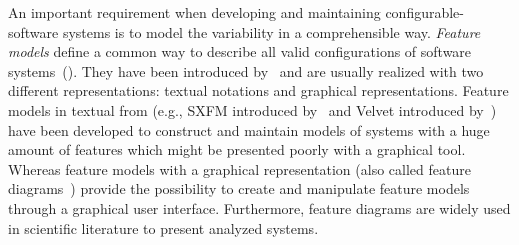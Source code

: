 An important requirement when developing and maintaining configurable-software systems is to model the variability in a comprehensible way. 
\textit{Feature models} define a common way to describe all valid configurations of software systems~(\cite{kang1990feature,czarnecki2000generative, apel2016feature}). 
They have been introduced by~\cite{kang1990feature} and are usually realized with two different representations: textual notations and graphical representations. 
Feature models in textual from (e.g., SXFM introduced by~\cite{Mendonca2009SSP} and Velvet introduced by~\cite{rosenmuller2011multi}) have been developed to construct and maintain models of systems with a huge amount of features which might be presented poorly with a graphical tool. 
Whereas feature models with a graphical representation (also called feature diagrams~\cite{kang1990feature}) provide the possibility to create and manipulate feature models through a graphical user interface. 
Furthermore, feature diagrams are widely used in scientific literature to present analyzed systems. 


